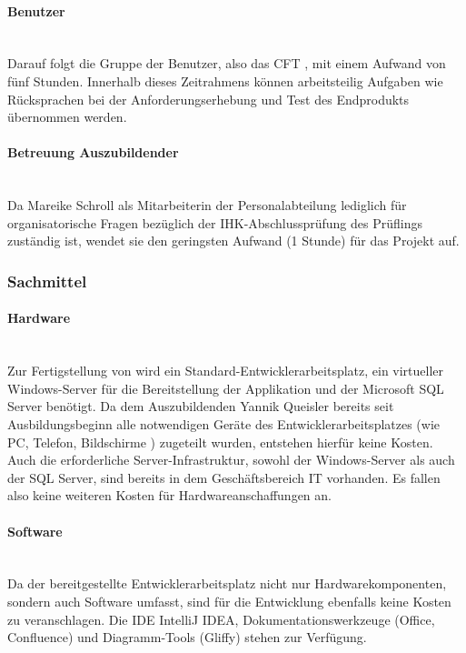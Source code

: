 \paragraph{Benutzer} ~\\
\label{p:Benutzer}
Darauf folgt die Gruppe der Benutzer, also das \ac{CFT} \teamName, mit einem Aufwand von fünf Stunden. Innerhalb dieses Zeitrahmens können arbeitsteilig Aufgaben wie Rücksprachen bei der Anforderungserhebung und Test des Endprodukts übernommen werden.

\paragraph{Betreuung Auszubildender} ~\\
\label{p:Betreuung}
Da Mareike Schroll als Mitarbeiterin der Personalabteilung lediglich für organisatorische Fragen bezüglich der IHK-Abschlussprüfung des Prüflings zuständig ist, wendet sie den geringsten Aufwand (1 Stunde) für das Projekt auf.

\subsubsection{Sachmittel}
\label{sec:Sachmittel}

\paragraph{Hardware} ~\\
\label{p:Hardware}
Zur Fertigstellung von \projektName wird ein Standard-Entwicklerarbeitsplatz, ein virtueller Windows-Server für die Bereitstellung der Applikation und der Microsoft SQL Server benötigt. Da dem Auszubildenden Yannik Queisler bereits seit Ausbildungsbeginn alle notwendigen Geräte des Entwicklerarbeitsplatzes (wie PC, Telefon, Bildschirme \etc) zugeteilt wurden, entstehen hierfür keine Kosten. Auch die erforderliche Server-Infrastruktur, sowohl der Windows-Server als auch der SQL Server, sind bereits in dem Geschäftsbereich IT vorhanden. Es fallen also keine weiteren Kosten für Hardwareanschaffungen an.

\paragraph{Software} ~\\
\label{p:Software}
Da der bereitgestellte Entwicklerarbeitsplatz nicht nur Hardwarekomponenten, sondern auch Software umfasst, sind für die Entwicklung ebenfalls keine Kosten zu veranschlagen. Die \ac{IDE} IntelliJ IDEA, Dokumentationswerkzeuge (Office, Confluence) und Diagramm-Tools (Gliffy) stehen zur Verfügung.

